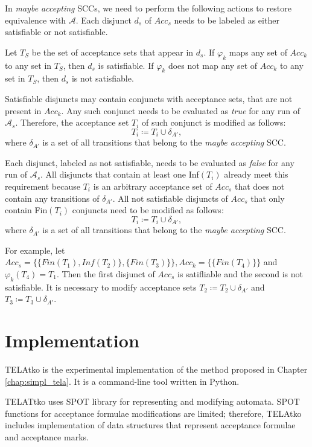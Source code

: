 \documentclass[
  digital, %
  twoside, %
  table,   %
  lof,     %
  lot,     %
]{fithesis3}
\begin{document}
In \emph{maybe accepting} SCCs, we need to perform the following actions to restore equivalence with $\mathcal{A}$. Each disjunct $d_s$ of $Acc_s$ needs to be labeled as either satisfiable or not satisfiable.

Let $T_S$ be the set of acceptance sets that appear in $d_s$. If $\varphi_k$  maps any set of $Acc_k$ to any set in $T_S$, then $d_s$ is satisfiable. If $\varphi_k$  does not map any set of $Acc_k$ to any set in $T_S$, then $d_s$ is not satisfiable.

Satisfiable disjuncts may contain conjuncts with acceptance sets, that are not present in $Acc_k$. Any such conjunct needs to be evaluated as \emph{true} for any run of $\mathcal{A}_s$. Therefore, the acceptance set $T_i$ of such conjunct is modified as follows:
\begin{equation*}
  T_i \coloneqq T_i \cup \delta_{A'},
\end{equation*}
where $\delta_{A'}$ is a set of all transitions that belong to the \emph{maybe accepting} SCC. 

Each disjunct, labeled as not satisfiable, needs to be evaluated as \emph{false} for any run of $\mathcal{A}_s$. All disjuncts that contain at least one Inf$(T_i)$ already meet this requirement because $T_i$ is an arbitrary acceptance set of $Acc_s$ that does not contain any transitions of $\delta_{A'}$. All not satisfiable disjuncts of $Acc_s$ that only contain Fin$(T_i)$ conjuncts need to be modified as follows:
\begin{equation*}
  T_i \coloneqq T_i \cup \delta_{A'},
\end{equation*}
where $\delta_{A'}$ is a set of all transitions that belong to the \emph{maybe accepting} SCC. 

For example, let $Acc_s = \{\{Fin(T_1), Inf(T_2)\}, \{Fin(T_3)\}\}, Acc_k = \{\{Fin(T_4)\}\}$ and $\varphi_k (T_4) = T_1$. Then the first disjunct of $Acc_s$ is satifliable and the second is not satisfiable. It is necessary to modify acceptance sets $T_2 \coloneqq T_2 \cup \delta_{A'}$ and $T_3 \coloneqq T_3 \cup \delta_{A'}$.

\chapter{Implementation}
TELAtko is the experimental implementation of the method proposed in Chapter \ref{chap:simpl_tela}. It is a command-line tool written in Python.

TELATtko uses SPOT library \cite{spot} for representing and modifying automata. SPOT functions for acceptance formulae modifications are limited; therefore, TELAtko includes implementation of data structures that represent acceptance formulae and acceptance marks. 
\end{document}
